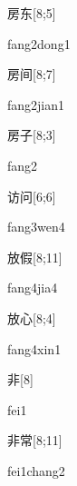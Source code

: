 \begin{verbete}{房东}[8;5]
\begin{pronuncia}{fang2dong1}
\end{pronuncia}
\end{verbete}

\begin{verbete}{房间}[8;7]
\begin{pronuncia}{fang2jian1}
\end{pronuncia}
\end{verbete}

\begin{verbete}[fang2]{房子}[8;3]
\begin{pronuncia}{fang2}
\end{pronuncia}
\end{verbete}

\begin{verbete}{访问}[6;6]
\begin{pronuncia}{fang3wen4}
\end{pronuncia}
\end{verbete}

\begin{verbete}{放假}[8;11]
\begin{pronuncia}{fang4jia4}
\end{pronuncia}
\end{verbete}

\begin{verbete}{放心}[8;4]
\begin{pronuncia}{fang4xin1}
\end{pronuncia}
\end{verbete}

\begin{verbete}[fei1]{非}[8]
\begin{pronuncia}{fei1}
\end{pronuncia}
\end{verbete}

\begin{verbete}{非常}[8;11]
\begin{pronuncia}{fei1chang2}
\end{pronuncia}
\end{verbete}

